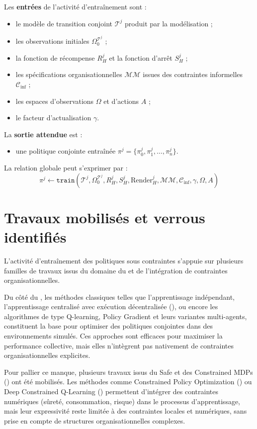 Les \textbf{entrées} de l’activité d’entraînement sont :
\begin{itemize}
    \item le modèle de transition conjoint $\mathcal{T}^j$ produit par la modélisation ;
    \item les observations initiales $\Omega^{\mathcal{T}^j}_0$ ;
    \item la fonction de récompense $R^j_H$ et la fonction d’arrêt $S^j_H$ ;
    \item les spécifications organisationnelles $\mathcal{MM}$ issues des contraintes informelles $\mathcal{C}_{\text{inf}}$ ;
    \item les espaces d’observations $\Omega$ et d’actions $A$ ;
    \item le facteur d’actualisation $\gamma$.
\end{itemize}

La \textbf{sortie attendue} est :
\begin{itemize}
    \item une politique conjointe entraînée $\pi^j = \{\pi^j_0, \pi^j_1, \dots, \pi^j_n\}$.
\end{itemize}

\noindent La relation globale peut s’exprimer par :
\begin{displaymath}
    \pi^j \gets \texttt{train}(\mathcal{T}^j, \Omega^{\mathcal{T}^j}_0, R^j_H, S^j_H, \text{Render}^j_H, \mathcal{MM}, \mathcal{C}_{\text{inf}}, \gamma, \Omega, A)
\end{displaymath}
\section{Travaux mobilisés et verrous identifiés}

L’activité d’entraînement des politiques sous contraintes s’appuie sur plusieurs familles de travaux issus du domaine du  et de l’intégration de contraintes organisationnelles.

Du côté du , les méthodes classiques telles que l’apprentissage indépendant, l’apprentissage centralisé avec exécution décentralisée (), ou encore les algorithmes de type Q-learning, Policy Gradient et leurs variantes multi-agents, constituent la base pour optimiser des politiques conjointes dans des environnements simulés. Ces approches sont efficaces pour maximiser la performance collective, mais elles n’intègrent pas nativement de contraintes organisationnelles explicites.

Pour pallier ce manque, plusieurs travaux issus du Safe  et des Constrained MDPs () ont été mobilisés. Les méthodes comme Constrained Policy Optimization () ou Deep Constrained Q-Learning () permettent d’intégrer des contraintes numériques (sûreté, consommation, risque) dans le processus d’apprentissage, mais leur expressivité reste limitée à des contraintes locales et numériques, sans prise en compte de structures organisationnelles complexes.

